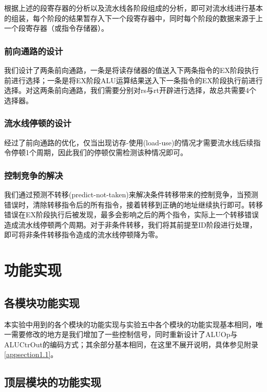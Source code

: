 \documentclass{cumcm}
\numberwithin{equation}{section}
\numberwithin{equation}{subsection}
\begin{document}
根据上述的段寄存器的分析以及流水线各阶段组成的分析，即可对流水线进行基本的组装，每个阶段的结果暂存入下一个段寄存器中，同时每个阶段的数据来源于上一个段寄存器（或指令存储器）。

\subsubsection{前向通路的设计}\label{section2.3.3}

我们设计了两条前向通路，一条是将读存储器的值送入下两条指令的EX阶段执行前进行选择；一条是将EX阶段ALU运算结果送入下一条指令的EX阶段执行前进行选择。对这两条前向通路，我们需要分别对rs与rt开辟进行选择，故总共需要4个选择器。

\subsubsection{流水线停顿的设计}\label{section2.3.4}

经过了前向通路的优化，仅当出现访存-使用(load-use)的情况才需要流水线后续指令停顿1个周期，因此我们的停顿仅需检测该种情况即可。

\subsubsection{控制竞争的解决}\label{section2.3.5}

我们通过预测不转移(predict-not-taken)来解决条件转移带来的控制竞争，当预测错误时，清除转移指令后的所有指令，接着转移到正确的地址继续执行即可。转移错误在EX阶段执行后被发现，最多会影响之后的两个指令，实际上一个转移错误造成流水线停顿两个周期。对于非条件转移，我们将其前提至ID阶段进行处理，即可将非条件转移指令造成的流水线停顿降为零。

\section{功能实现}\label{section3}

\subsection{各模块功能实现}\label{section3.1}

本实验中用到的各个模块的功能实现与实验五中各个模块的功能实现基本相同，唯一需要修改的地方是我们增加了一些控制信号，同时重新设计了ALUOp与ALUCtrOut的编码方式；其余部分基本相同，在这里不展开说明，具体参见附录 \ref{appsection1.1}。

\subsection{顶层模块的功能实现}\label{section3.2}
\end{document}
